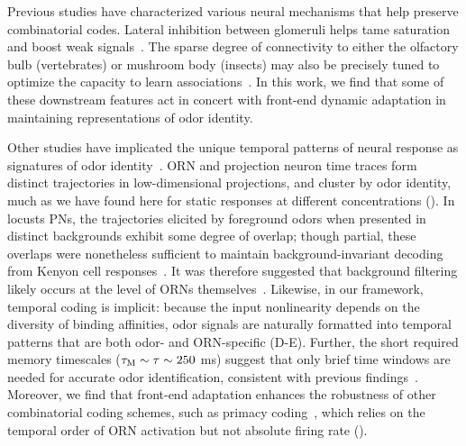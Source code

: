 \documentclass[9pt,lineno]{elife}
\begin{document}


Previous studies have characterized various neural mechanisms that help preserve combinatorial codes. 
Lateral inhibition between glomeruli helps tame saturation and boost weak signals~\citep{divisive_normalization}. %
The sparse degree of connectivity to either the olfactory bulb (vertebrates) or mushroom body (insects) %
may also be precisely tuned to optimize the capacity to learn associations~\citep{litwinkumar}. In this work, we find that some of these downstream features act in concert with front-end dynamic adaptation in maintaining representations of odor identity.

Other studies have implicated the unique temporal patterns of neural response as signatures of odor identity~\citep{stopfer_temporal_model, multiple_timescales_stopfer, stopfer_nat_neuro, stopfer_temporal_channel}. {\color{blue} ORN and projection neuron time traces form distinct trajectories in low-dimensional projections, and cluster by odor identity, much as we have found here for static responses at different concentrations ().} In locusts PNs, the trajectories elicited by foreground odors when presented in distinct backgrounds exhibit some degree of overlap; though partial, these overlaps were nonetheless sufficient to maintain background-invariant decoding from Kenyon cell responses~\citep{coding_background}. It was therefore suggested that background filtering likely occurs at the level of ORNs themselves~\citep{coding_background}. Likewise, in our framework, temporal coding is implicit: because the input nonlinearity depends on the diversity of binding affinities, %
odor signals are naturally formatted into temporal patterns that are both odor- and ORN-specific  (D-E). Further, the short required memory timescales  ($\tau_{\textup M} \sim \tau \sim 250$ ms) suggest that only brief time windows are needed for accurate odor identification, consistent with previous findings~\citep{stopfer_nat_neuro, coding_background}. Moreover, we find that front-end adaptation enhances the robustness of other combinatorial coding schemes, such as primacy coding~\citep{primacy_coding}, which relies on the temporal order of ORN activation but not absolute firing rate ().
\end{document}
